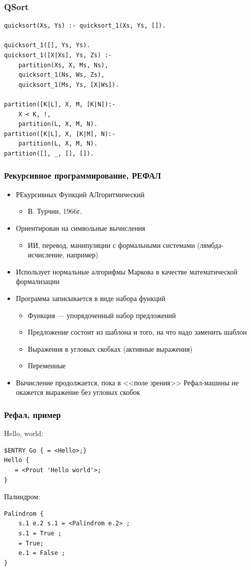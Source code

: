 \documentclass[xetex,mathserif,serif]{beamer}
\begin{document}
	\begin{frame}[fragile]
		\frametitle{QSort}
		\begin{verbatim}
quicksort(Xs, Ys) :- quicksort_1(Xs, Ys, []).

quicksort_1([], Ys, Ys).
quicksort_1([X|Xs], Ys, Zs) :-
    partition(Xs, X, Ms, Ns),
    quicksort_1(Ns, Ws, Zs),
    quicksort_1(Ms, Ys, [X|Ws]).
 
partition([K|L], X, M, [K|N]):-
    X < K, !,
    partition(L, X, M, N).
partition([K|L], X, [K|M], N):-
    partition(L, X, M, N).
partition([], _, [], []).
		\end{verbatim}
	\end{frame}

	\begin{frame}
		\frametitle{Рекурсивное программирование, РЕФАЛ}
		\begin{itemize}
			\item РЕкурсивных Функций АЛгоритмический
			\begin{itemize}
				\item В. Турчин, 1966г.
			\end{itemize}
			\item Ориентирован на символьные вычисления
			\begin{itemize}
				\item ИИ, перевод, манипуляции с формальными системами (лямбда-исчисление, например)
			\end{itemize}
			\item Использует нормальные алгорифмы Маркова в качестве математической формализации
			\item Программа записывается в виде набора функций
			\begin{itemize}
				\item Функция --- упорядоченный набор предложений
				\item Предложение состоит из шаблона и того, на что надо заменить шаблон
				\item Выражения в угловых скобках (активные выражения)
				\item Переменные
			\end{itemize}
			\item Вычисление продолжается, пока в <<поле зрения>> Рефал-машины не окажется выражение без угловых скобок
		\end{itemize}
	\end{frame}

	\begin{frame}[fragile]
		\frametitle{Рефал, пример}
		Hello, world:
		\begin{verbatim}
$ENTRY Go { = <Hello>;}
Hello {
   = <Prout 'Hello world'>;
}
		\end{verbatim}
		\vspace{3mm}
		Палиндром:
		\begin{verbatim}
Palindrom {
    s.1 e.2 s.1 = <Palindrom e.2> ;
    s.1 = True ;
    = True;
    e.1 = False ;
}
		\end{verbatim}
	\end{frame}
\end{document}
